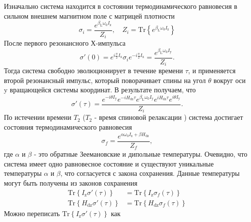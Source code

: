 \documentclass[review]{elsarticle}
\begin{document}
Изначально система находится в состоянии термодинамического равновесия в сильном внешнем магнитном поле с матрицей плотности
%
\begin{equation}
    \label{eq:a1}
   \sigma_{i} = \dfrac{e^{\beta_\mathrm{L} \omega_{0} I_\mathrm{z}}}{Z_{i}} ,
   \quad
   Z_{i} = \mathrm{Tr}\left\{e^{\beta_\mathrm{L} \omega_{0} I_\mathrm{z}} \right\}
\end{equation}
%
После первого резонансного Х-импульса
%
\begin{equation}
    \label{eq:a2}
    \sigma'(0) = e^{ i \frac \pi 2 I_\mathrm{x}}
    \sigma_{i}
    e^{-i \frac \pi 2 I_\mathrm{x}}
    = \dfrac{e^{\beta_\mathrm{L} \omega_{0} I_\mathrm{y}}}{Z_{i}}  .
\end{equation}
%
Тогда система свободно эволюционирует в течение времени $\tau$,
и применяется второй резонансный импульс, который поворачивает спины на угол $\theta$ вокруг оси y вращающейся системы координат.
В результате получаем, что
\begin{equation}
    \label{eq:a3}
    \sigma'(\tau) 
    = \dfrac{
      e^{-i \theta I_\mathrm{y}} e^{-i H_\mathrm{dz} \tau} 
      e^{\beta_\mathrm{L} \omega_{0} I_\mathrm{y}}
      e^{i H_\mathrm{dz} \tau} e^{i \theta I_\mathrm{y}}
    }{Z_{i}}. 
\end{equation}
%
По истечении времени $T_2$ ($T_2$ - время спиновой релаксации \cite{Goldman_1970}) система достигает состояния термодинамического равновесия
\begin{equation}
    \label{eq:a4}
    \sigma_{f} 
    = \dfrac{ e^{\alpha \omega_{0} I_\mathrm{z} + \beta H_\mathrm{dz}} }{Z_f},
\end{equation}
%
где $\alpha$ и $\beta$ - это обратные Зеемановские и дипольные температуры.
Очевидно, что система имеет одно равновесное состояние 
и существуют уникальные температуры $\alpha$ и $\beta$,
что согласуется с закона сохранения.
Данные температуры могут быть получены из законов сохранения
\begin{align}
    \label{eq:a5}
    \mathrm{Tr} \left\{ I_\mathrm{z} \sigma'(\tau) \right\}
    & = \mathrm{Tr} \left\{ I_\mathrm{z} \sigma_{f}(\tau) \right\}
    \\
    \label{eq:a6}
    \mathrm{Tr} \left\{ H_\mathrm{dz} \sigma'(\tau) \right\}
    & = \mathrm{Tr} \left\{ H_\mathrm{dz} \sigma_{f}(\tau) \right\}
\end{align}
%
Можно переписать $\mathrm{Tr} \left\{ I_\mathrm{z} \sigma'(\tau) \right\}$ как
%
\end{document}
